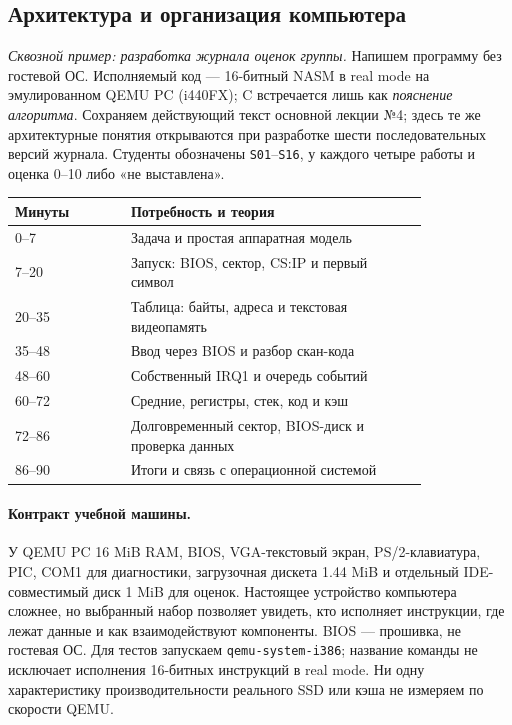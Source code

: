 \begingroup
\setlength{\emergencystretch}{2em}
\subsection*{Архитектура и организация компьютера}
\label{lecture04-journal}
\textit{Сквозной пример: разработка журнала оценок группы.}
Напишем программу без гостевой ОС. Исполняемый код --- 16-битный NASM
в real mode на эмулированном QEMU PC (i440FX); C встречается лишь как
\emph{пояснение алгоритма}. Сохраняем действующий текст основной лекции №4;
здесь те же архитектурные понятия открываются при разработке шести
последовательных версий журнала. Студенты обозначены \texttt{S01}--\texttt{S16},
у каждого четыре работы и оценка 0--10 либо «не выставлена».

\begin{center}\small
\begin{tabular}{|p{0.23\linewidth}|p{0.59\linewidth}|}\hline
Минуты & Потребность и теория \\ \hline
0--7 & Задача и простая аппаратная модель \\
7--20 & Запуск: BIOS, сектор, CS:IP и первый символ \\
20--35 & Таблица: байты, адреса и текстовая видеопамять \\
35--48 & Ввод через BIOS и разбор скан-кода \\
48--60 & Собственный IRQ1 и очередь событий \\
60--72 & Средние, регистры, стек, код и кэш \\
72--86 & Долговременный сектор, BIOS-диск и проверка данных \\
86--90 & Итоги и связь с операционной системой \\ \hline
\end{tabular}
\end{center}

\paragraph{Контракт учебной машины.}
У QEMU PC 16 MiB RAM, BIOS, VGA-текстовый экран, PS/2-клавиатура,
PIC, COM1 для диагностики, загрузочная дискета 1.44 MiB и отдельный
IDE-совместимый диск 1 MiB для оценок. Настоящее устройство компьютера
сложнее, но выбранный набор позволяет увидеть, кто исполняет инструкции,
где лежат данные и как взаимодействуют компоненты. BIOS --- прошивка,
не гостевая ОС. Для тестов запускаем \texttt{qemu-system-i386}; название
команды не исключает исполнения 16-битных инструкций в real mode.
Ни одну характеристику производительности реального SSD или кэша не
измеряем по скорости QEMU.

